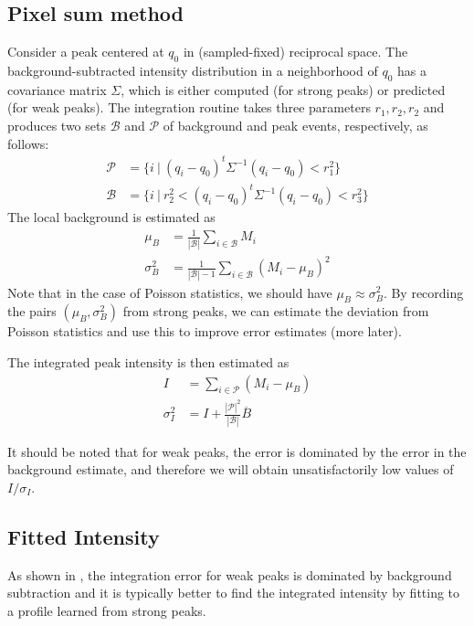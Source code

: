 \documentclass[twocolumn,preprintnumbers,amsmath,amssymb]{revtex4}
\newcommand{\calP}{\mathcal{P}}
\newcommand{\calB}{\mathcal{B}}
\begin{document}
\subsection{Pixel sum method}
Consider a peak centered at $q_0$ in (sampled-fixed) reciprocal space. The background-subtracted intensity distribution in a neighborhood of $q_0$ has a covariance matrix $\Sigma$, which is either computed (for strong peaks) or predicted (for weak peaks). The integration routine takes three parameters $r_1, r_2, r_2$ and produces
two sets $\calB$ and $\calP$ of background and peak events, respectively, as follows:
\begin{align}
  \calP &= \{ i \ | \ (q_i-q_0)^t \Sigma^{-1} (q_i-q_0) < r_1^2 \} \\
  \calB &= \{ i \ | \ r_2^2 < (q_i-q_0)^t \Sigma^{-1} (q_i-q_0) < r_3^2 \}
\end{align}
The local background is estimated as
\begin{align}
  \mu_B &= \frac{1}{|\calB|} \sum_{i \in \calB} M_i \\
  \sigma^2_B &= \frac{1}{|\calB|-1} \sum_{i \in \calB} (M_i - \mu_B)^2
\end{align}
Note that in the case of Poisson statistics, we should have $\mu_B \approx \sigma^2_B$. By recording the pairs $(\mu_B, \sigma^2_B)$ from strong peaks, we can estimate the deviation from Poisson statistics and use this to improve error estimates (more later).

The integrated peak intensity is then estimated as
\begin{align}
  I &= \sum_{i \in \calP} (M_i - \mu_B) \\
  \sigma^2_I &= I + \frac{|\calP|^2}{|\calB|} \overline{B}
\end{align}

It should be noted that for weak peaks, the error is dominated by the error in the background estimate, and therefore we will obtain unsatisfactorily low values of $I/\sigma_I$.

\subsection{Fitted Intensity}
As shown in \cite{Dia69}, the integration error for weak peaks is dominated by background subtraction
and it is typically better to find the integrated intensity by fitting to a profile learned from strong peaks.
\end{document}
